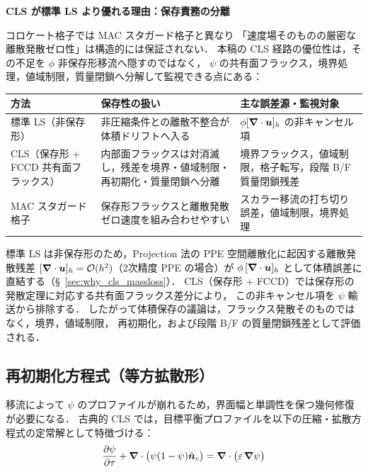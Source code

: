 \medskip\noindent\textbf{CLS が標準 LS より優れる理由：保存責務の分離}

コロケート格子では MAC スタガード格子と異なり
「速度場そのものの厳密な離散発散ゼロ性」は構造的には保証されない．
本稿の CLS 経路の優位性は，その不足を $\phi$ 非保存形移流へ隠すのではなく，
$\psi$ の共有面フラックス，境界処理，値域制限，質量閉鎖へ分解して監視できる点にある：

\begin{center}
\renewcommand{\arraystretch}{\PaperTableArrayStretch}
\begin{tabular}{p{3.5cm}p{4.5cm}>{\raggedright\arraybackslash}p{5cm}}
\hline
方法 & 保存性の扱い & 主な誤差源・監視対象 \\
\hline
標準 LS（非保存形） & 非圧縮条件との離散不整合が体積ドリフトへ入る &
  $\phi[\bm{\nabla}\cdot\bm{u}]_h$ の非キャンセル項 \\
CLS（保存形 + FCCD 共有面フラックス） & 内部面フラックスは対消滅し，残差を境界・値域制限・再初期化・質量閉鎖へ分離 &
  境界フラックス，値域制限，格子転写，段階 B/F 質量閉鎖残差 \\
MAC スタガード格子 & 保存形フラックスと離散発散ゼロ速度を組み合わせやすい &
  スカラー移流の打ち切り誤差，値域制限，境界処理 \\
\hline
\end{tabular}
\end{center}

標準 LS は非保存形のため，Projection 法の PPE 空間離散化に起因する離散発散残差
$[\bm{\nabla}\cdot\bm{u}]_h = \mathcal{O}(h^2)$（2次精度 PPE の場合）が
$\phi\,[\bm{\nabla}\cdot\bm{u}]_h$ として体積誤差に直結する（§~\ref{sec:why_cls_massloss}）．
CLS（保存形 + FCCD）では保存形の発散定理に対応する共有面フラックス差分により，
この非キャンセル項を $\psi$ 輸送から排除する．
したがって体積保存の議論は，フラックス発散そのものではなく，境界，値域制限，
再初期化，および段階 B/F の質量閉鎖残差として評価される．

\subsection{再初期化方程式（等方拡散形）}
\label{sec:reinit}

移流によって $\psi$ のプロファイルが崩れるため，界面幅と単調性を保つ幾何修復が必要になる．
古典的 CLS では，目標平衡プロファイルを以下の圧縮・拡散方程式の定常解として特徴づける：
\begin{equation}
 \dfrac{\partial \psi}{\partial \tau} + \bm{\nabla}\cdot\bigl(\psi(1-\psi)\hat{\bm n}_c\bigr) = \bm{\nabla}\cdot\bigl(\varepsilon\,\bm{\nabla}\psi\bigr)
 \label{eq:cls_reinit_iso}
\end{equation}

